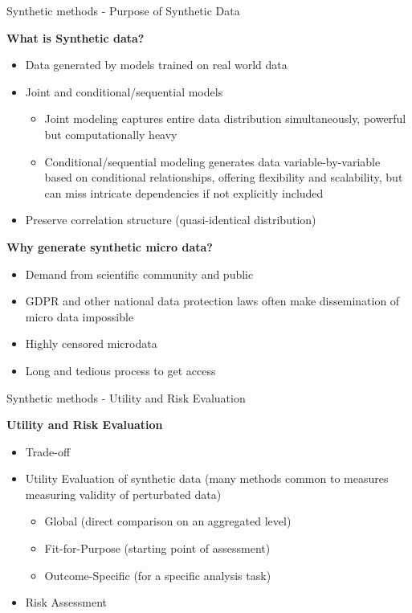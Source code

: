 \documentclass[
	aspectratio = 169
 ]{beamer}
\begin{document}
\begin{frame}{Synthetic methods - Purpose of Synthetic Data}

\textbf{What is Synthetic data?}
\begin{itemize}
    \item Data generated by models trained on real world data
    \item Joint and conditional/sequential models
    \begin{itemize}
    \item  Joint modeling captures entire data distribution simultaneously, powerful but computationally heavy
    \item Conditional/sequential  modeling generates data variable-by-variable based on conditional relationships, offering flexibility and scalability, but can miss intricate dependencies if not explicitly included
    \end{itemize}
    \item Preserve correlation structure (quasi-identical distribution)    
\end{itemize}

\textbf{Why generate synthetic micro data?}
\begin{itemize}
\item Demand from scientific community and public
\item GDPR and other national data protection laws often make dissemination of micro data impossible
\item Highly censored microdata
\item Long and tedious process to get access
\end{itemize}

\end{frame}
\begin{frame}{Synthetic methods - Utility and Risk Evaluation}

\textbf{Utility and Risk Evaluation}

\begin{itemize}
    \item Trade-off
    \item Utility Evaluation of synthetic data \small{(many methods common to measures measuring validity of perturbated data)}
    
        \begin{itemize}
        \item Global (direct comparison on an aggregated level)
        \item Fit-for-Purpose (starting point of assessment)
        \item Outcome-Specific (for a specific analysis task)
        \end{itemize}
    \item Risk Assessment
    
\end{itemize}
\end{frame}
\end{document}
